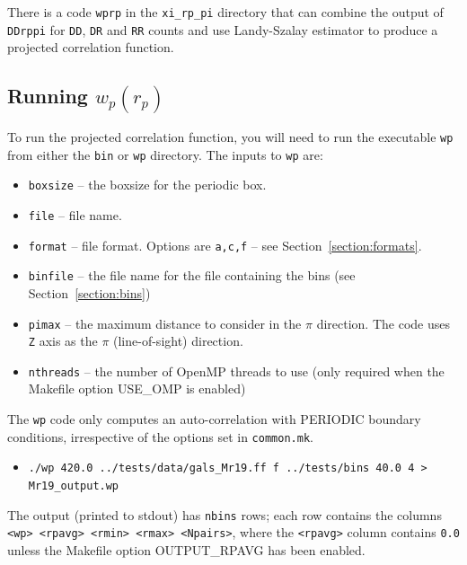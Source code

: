 \documentclass[12pt,titlepage]{article}
\newcommand{\wprp}{\ensuremath{{w_p(r_p)}}\xspace}
\begin{document}
There is a code \texttt{wprp} in the \texttt{xi\_rp\_pi} directory that can combine the output of \texttt{DDrppi} for \texttt{DD}, \texttt{DR} and \texttt{RR} counts 
and use Landy-Szalay estimator to produce a projected correlation function.  

\subsection{Running \texorpdfstring{\wprp}{wp(rp)}}
To run the projected correlation function, you will need to run the executable \texttt{wp} from either the \texttt{bin} or \texttt{wp} directory. The inputs 
to \texttt{wp} are:
\begin{itemize}
\item \texttt{boxsize} -- the boxsize for the periodic box. 
\item \texttt{file}    -- file name.
\item \texttt{format}  -- file format. Options are \texttt{a,c,f} -- see Section~\ref{section:formats}.
\item \texttt{binfile} -- the file name for the file containing the bins (see Section~\ref{section:bins})
\item \texttt{pimax}   -- the maximum distance to consider in the $\pi$ direction. The code uses \texttt{Z} axis as the $\pi$ (line-of-sight) direction. 
\item \texttt{nthreads} -- the number of OpenMP threads to use (only required when the Makefile option USE\_OMP is enabled)
\end{itemize}
The \texttt{wp} code only computes an auto-correlation with PERIODIC boundary conditions, irrespective of the options set in \texttt{common.mk}. 
\begin{itemize}
\item {\scriptsize \texttt{./wp  420.0 ../tests/data/gals\_Mr19.ff f ../tests/bins 40.0 4 > Mr19\_output.wp}}
\end{itemize}
The output (printed to stdout) has \texttt{nbins} rows; each row contains the columns \texttt{<wp> <rpavg> <rmin> <rmax> <Npairs>}, where the \texttt{<rpavg>} column contains \texttt{0.0} unless the 
Makefile option OUTPUT\_RPAVG has been enabled. 
\end{document}
